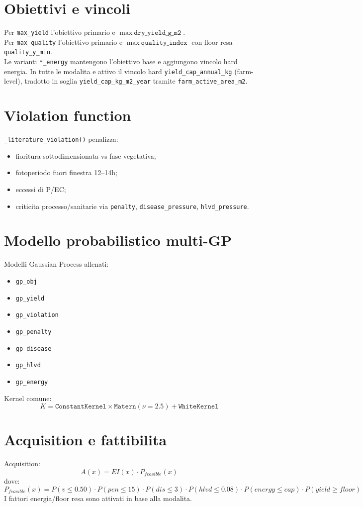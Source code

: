﻿\documentclass[11pt,a4paper]{report}
\begin{document}
\section{Obiettivi e vincoli}
Per \texttt{max\_yield} l'obiettivo primario e \(\max\ \texttt{dry\_yield\_g\_m2}\).\\
Per \texttt{max\_quality} l'obiettivo primario e \(\max\ \texttt{quality\_index}\) con floor resa \texttt{quality\_y\_min}.\\
Le varianti \texttt{*\_energy} mantengono l'obiettivo base e aggiungono vincolo hard energia.
In tutte le modalita e attivo il vincolo hard \texttt{yield\_cap\_annual\_kg} (farm-level),
tradotto in soglia \texttt{yield\_cap\_kg\_m2\_year} tramite \texttt{farm\_active\_area\_m2}.

\section{Violation function}
\texttt{\_literature\_violation()} penalizza:
\begin{itemize}
  \item fioritura sottodimensionata vs fase vegetativa;
  \item fotoperiodo fuori finestra 12--14h;
  \item eccessi di P/EC;
  \item criticita processo/sanitarie via \texttt{penalty}, \texttt{disease\_pressure}, \texttt{hlvd\_pressure}.
\end{itemize}

\section{Modello probabilistico multi-GP}
Modelli Gaussian Process allenati:
\begin{itemize}
  \item \texttt{gp\_obj}
  \item \texttt{gp\_yield}
  \item \texttt{gp\_violation}
  \item \texttt{gp\_penalty}
  \item \texttt{gp\_disease}
  \item \texttt{gp\_hlvd}
  \item \texttt{gp\_energy}
\end{itemize}
Kernel comune:
\[
K = \texttt{ConstantKernel} \times \texttt{Matern}(\nu=2.5) + \texttt{WhiteKernel}
\]

\section{Acquisition e fattibilita}
Acquisition:
\[
A(x) = EI(x)\cdot P_{feasible}(x)
\]
dove:
\[
P_{feasible}(x)=P(v\le 0.50)\cdot P(pen\le 15)\cdot P(dis\le 3)\cdot P(hlvd\le 0.08)\cdot P(energy\le cap)\cdot P(yield\ge floor)
\]
I fattori energia/floor resa sono attivati in base alla modalita.
\end{document}
